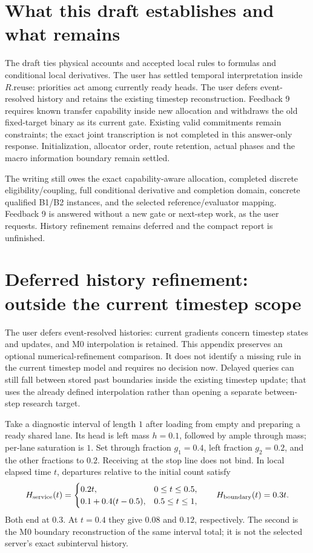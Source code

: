 \documentclass[11pt]{article}
\begin{document}
\section{What this draft establishes and what remains}

The draft ties physical accounts and accepted local rules to formulas and conditional local derivatives. The user has settled temporal interpretation inside $R.\mathrm{reuse}$: priorities act among currently ready heads. The user defers event-resolved history and retains the existing timestep reconstruction. Feedback 9 requires known transfer capability inside new allocation and withdraws the old fixed-target binary as its current gate. Existing valid commitments remain constraints; the exact joint transcription is not completed in this answer-only response. Initialization, allocator order, route retention, actual phases and the macro information boundary remain settled.

The writing still owes the exact capability-aware allocation, completed discrete eligibility/coupling, full conditional derivative and completion domain, concrete qualified B1/B2 instances, and the selected reference/evaluator mapping. Feedback 9 is answered without a new gate or next-step work, as the user requests. History refinement remains deferred and the compact report is unfinished.

\appendix

\section{Deferred history refinement: outside the current timestep scope}
\label{sec:history-choice}

The user defers event-resolved histories: current gradients concern timestep states and updates, and M0 interpolation is retained. This appendix preserves an optional numerical-refinement comparison. It does not identify a missing rule in the current timestep model and requires no decision now. Delayed queries can still fall between stored past boundaries inside the existing timestep update; that uses the already defined interpolation rather than opening a separate between-step research target.

Take a diagnostic interval of length $1$ after loading from empty and preparing a ready shared lane. Its head is left mass $h=0.1$, followed by ample through mass; per-lane saturation is $1$. Set through fraction $g_1=0.4$, left fraction $g_2=0.2$, and the other fractions to $0.2$. Receiving at the stop line does not bind. In local elapsed time $t$, departures relative to the initial count satisfy
\begin{equation}
 H_{\rm service}(t)=
 \begin{cases}
 0.2t,&0\leq t\leq0.5,\\
 0.1+0.4(t-0.5),&0.5\leq t\leq1,
 \end{cases}
 \qquad H_{\rm boundary}(t)=0.3t.
 \label{eq:history-choice-curves}
\end{equation}
Both end at $0.3$. At $t=0.4$ they give $0.08$ and $0.12$, respectively. The second is the M0 boundary reconstruction of the same interval total; it is not the selected server's exact subinterval history.
\end{document}
